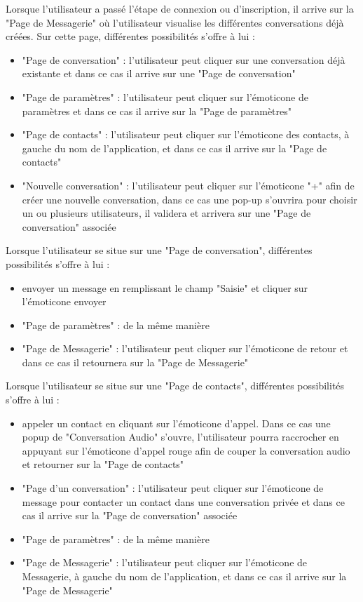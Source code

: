 \documentclass[a4paper,12pt]{article}
\begin{document}
	Lorsque l'utilisateur a passé l'étape de connexion ou d'inscription, il arrive sur la "Page de Messagerie" où l'utilisateur visualise les différentes conversations déjà créées. Sur cette page, différentes possibilités s'offre à lui :
	\begin{itemize}
		\item "Page de conversation" : l'utilisateur peut cliquer sur une conversation déjà existante et dans ce cas il arrive sur une "Page de conversation"
		\item "Page de paramètres" : l'utilisateur peut cliquer sur l'émoticone de paramètres et dans ce cas il arrive sur la "Page de paramètres"
		\item "Page de contacts" : l'utilisateur peut cliquer sur l'émoticone des contacts, à gauche du nom de l'application, et dans ce cas il arrive sur la "Page de contacts"
		\item "Nouvelle conversation" : l'utilisateur peut cliquer sur l'émoticone "+" afin de créer une nouvelle conversation, dans ce cas une pop-up s'ouvrira pour choisir un ou plusieurs utilisateurs, il validera et arrivera sur une "Page de conversation" associée\\
	\end{itemize}

	Lorsque l'utilisateur se situe sur une "Page de conversation", différentes possibilités s'offre à lui :
	\begin{itemize}
		\item envoyer un message en remplissant le champ "Saisie" et cliquer sur l'émoticone envoyer
		\item "Page de paramètres" : de la même manière
		\item "Page de Messagerie" : l'utilisateur peut cliquer sur l'émoticone de retour et dans ce cas il retournera sur la "Page de Messagerie"\\
	\end{itemize}

	\newpage

	Lorsque l'utilisateur se situe sur une "Page de contacts", différentes possibilités s'offre à lui :
	\begin{itemize}
		\item appeler un contact en cliquant sur l'émoticone d'appel.
		Dans ce cas une popup de "Conversation Audio" s'ouvre, l'utilisateur pourra raccrocher en appuyant sur l'émoticone d'appel rouge afin de couper la conversation audio et retourner sur la "Page de contacts"
		\item "Page d'un conversation" : l'utilisateur peut cliquer sur l'émoticone de message pour contacter un contact dans une conversation privée et dans ce cas il arrive sur la "Page de conversation" associée
		\item "Page de paramètres" : de la même manière
		\item "Page de Messagerie" : l'utilisateur peut cliquer sur l'émoticone de Messagerie, à gauche du nom de l'application, et dans ce cas il arrive sur la "Page de Messagerie"\\
	\end{itemize}
\end{document}
